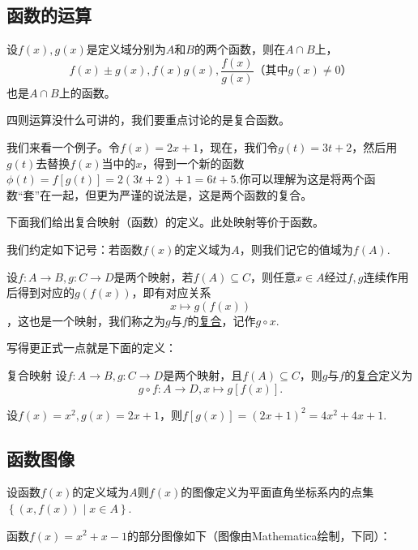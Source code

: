 \documentclass[lang=cn,math=cm,chinesefont=nofont,11pt,scheme=chinese,onecol]{elegantbook}
\begin{document}
\subsection{函数的运算}

设$f(x),g(x)$是定义域分别为$A$和$B$的两个函数，则在$A\cap B$上，$$f(x)\pm g(x),f(x)g(x),\dfrac{f(x)}{g(x)}\text{（其中}g(x)\neq 0\text{）}$$也是$A\cap B$上的函数。

四则运算没什么可讲的，我们要重点讨论的是复合函数。

我们来看一个例子。令$f(x)=2x+1$，现在，我们令$g(t)=3t+2$，然后用$g(t)$去替换$f(x)$当中的$x$，得到一个新的函数$\phi(t)=f[g(t)]=2(3t+2)+1=6t+5$.你可以理解为这是将两个函数“套”在一起，但更为严谨的说法是，这是两个函数的复合。

下面我们给出复合映射（函数）的定义。此处映射等价于函数。

\begin{remark}
  我们约定如下记号：若函数$f(x)$的定义域为$A$，则我们记它的值域为$f(A)$.
\end{remark}

设$f:A\rightarrow B,g:C\rightarrow D$是两个映射，若$f(A)\subseteq C$，则任意$x\in A$经过$f,g$连续作用后得到对应的$g(f(x))$，即有对应关系$$x\mapsto g(f(x))$$，这也是一个映射，我们称之为$g$与$f$的\underline{复合}，记作$g\circ x$.

写得更正式一点就是下面的定义：

\begin{definition}{复合映射}
  设$f:A\rightarrow B,g:C\rightarrow D$是两个映射，且$f(A)\subseteq C$，则$g$与$f$的\underline{复合}定义为$$g\circ f:A\rightarrow D,x\mapsto g[f(x)].$$
\end{definition}

\begin{example}
  设$f(x)=x^2,g(x)=2x+1$，则$f[g(x)]=(2x+1)^2=4x^2+4x+1$.
\end{example}

\subsection{函数图像}

\begin{definition}
  设函数$f(x)$的定义域为$A$则$f(x)$的图像定义为平面直角坐标系内的点集$\left\{(x,f(x))\mid x\in A\right\}$.
\end{definition}

\begin{example}
  函数$f(x)=x^2+x-1$的部分图像如下（图像由Mathematica绘制，下同）：
\end{example}
\end{document}
